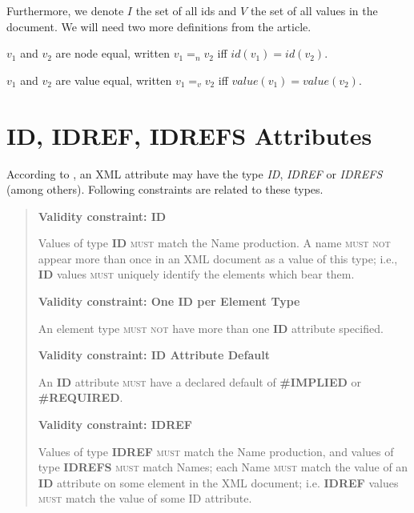 Furthermore, we denote $I$ %
the set of all ids and $V$ %
the set of all values in the document. We will need two more definitions from the article.

\begin{define}
	$v_1$ and $v_2$ are node equal, written $v_1 =_n v_2$ iff $id(v_1) = id(v_2)$.
\end{define}

\begin{define}
	$v_1$ and $v_2$ are value equal, written $v_1 =_v v_2$ iff $value(v_1) = value(v_2)$.
\end{define}

\section{ID, IDREF, IDREFS Attributes}
\label{section-definitions-id-attributes}

According to \cite{Bray:08:EML}, an XML attribute may have the type \textit{ID}, \textit{IDREF} or \textit{IDREFS} (among others). Following constraints are related to these types.

\begin{quote}
\textbf{Validity constraint: ID}

Values of type \textbf{ID} \textsc{must} match the Name production. A name \textsc{must not} appear more than once in an XML document as a value of this type; i.e., \textbf{ID} values \textsc{must} uniquely identify the elements which bear them.

\textbf{Validity constraint: One ID per Element Type}

An element type \textsc{must not} have more than one \textbf{ID} attribute specified.

\textbf{Validity constraint: ID Attribute Default}

An \textbf{ID} attribute \textsc{must} have a declared default of \textbf{\#IMPLIED} or \textbf{\#REQUIRED}.

\textbf{Validity constraint: IDREF}

Values of type \textbf{IDREF} \textsc{must} match the Name production, and values of type \textbf{IDREFS} \textsc{must} match Names; each Name \textsc{must} match the value of an \textbf{ID} attribute on some element in the XML document; i.e. \textbf{IDREF} values \textsc{must} match the value of some ID attribute.
\end{quote}

